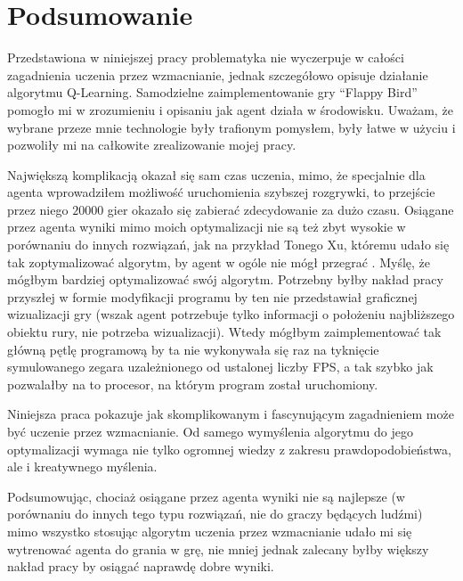 \documentclass[a4paper, 12pt,oneside]{book}
\newcommand\chap[1]{%
  \chapter*{#1}%
  \addcontentsline{toc}{chapter}{#1}}
\begin{document}
\chap{Podsumowanie}
Przedstawiona w niniejszej pracy problematyka nie wyczerpuje w całości
zagadnienia uczenia przez wzmacnianie, jednak szczegółowo opisuje działanie
algorytmu Q-Learning. Samodzielne zaimplementowanie gry ``Flappy Bird'' pomogło
mi w zrozumieniu i opisaniu jak agent działa w środowisku. Uważam, że wybrane
przeze mnie technologie były trafionym pomysłem, były łatwe w użyciu i
pozwoliły mi na całkowite zrealizowanie mojej pracy.

Największą komplikacją okazał się sam czas uczenia, mimo, że specjalnie dla 
agenta wprowadziłem możliwość uruchomienia szybszej rozgrywki, to przejście
przez niego $20000$ gier okazało się zabierać zdecydowanie za dużo czasu.
Osiągane przez agenta wyniki mimo moich optymalizacji nie są też zbyt wysokie w
porównaniu do innych rozwiązań, jak na przykład Tonego Xu, któremu udało się
tak zoptymalizować algorytm, by agent w ogóle nie mógł
przegrać \cite{tds_rl_score}. Myślę, że mógłbym bardziej optymalizować swój
algorytm. Potrzebny byłby nakład pracy przyszłej w formie modyfikacji programu
by ten nie przedstawiał graficznej wizualizacji gry (wszak agent potrzebuje
tylko informacji o położeniu najbliższego obiektu rury, nie potrzeba
wizualizacji). Wtedy mógłbym zaimplementować tak główną pętlę programową by ta
nie wykonywała się raz na tyknięcie symulowanego zegara uzależnionego od
ustalonej liczby FPS, a tak szybko jak pozwalałby na to procesor, na którym
program został uruchomiony.
	
Niniejsza praca pokazuje jak skomplikowanym i fascynującym zagadnieniem może
być uczenie przez wzmacnianie. Od samego wymyślenia algorytmu do jego
optymalizacji wymaga nie tylko ogromnej wiedzy z zakresu prawdopodobieństwa,
ale i kreatywnego myślenia.

Podsumowując, chociaż osiągane przez agenta wyniki nie są najlepsze (w
porównaniu do innych tego typu rozwiązań, nie do graczy będących ludźmi)
mimo wszystko stosując algorytm uczenia przez wzmacnianie udało mi się
wytrenować agenta do grania w grę, nie mniej jednak zalecany byłby większy
nakład pracy by osiągać naprawdę dobre wyniki.


%
%


%

\end{document}
